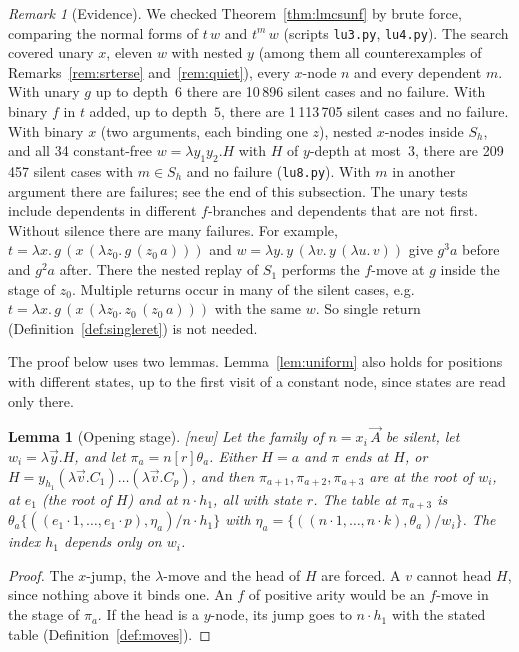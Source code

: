 \documentclass[11pt]{article}
\newcommand{\suc}[2]{#1{\cdot}#2}
\newcommand{\New}{\textsf{[new]}}
\theoremstyle{plain}
\newtheorem{lemma}[theorem]{Lemma}
\theoremstyle{definition}
\theoremstyle{remark}
\newtheorem{remark}[theorem]{Remark}
\begin{document}
\begin{remark}[Evidence]\label{rem:lmcsunfev}
We checked Theorem~\ref{thm:lmcsunf} by brute force, comparing the normal
forms of $t\,w$ and $t^m\,w$ (scripts \texttt{lu3.py},
\texttt{lu4.py}).  The search covered unary $x$, eleven $w$ with nested
$y$ (among them all counterexamples of Remarks~\ref{rem:srterse}
and~\ref{rem:quiet}), every $x$-node $n$ and every dependent $m$.  With
unary $g$ up to depth~$6$ there are 10\,896 silent cases and no failure.
With binary $f$ in $t$ added, up to depth~$5$, there are 1\,113\,705
silent cases and no failure.  With binary $x$ (two arguments, each
binding one $z$), nested $x$-nodes inside $S_h$, and all 34 constant-free
$w=\lambda y_1y_2.H$ with $H$ of $y$-depth at most~$3$, there are
209\,457 silent cases with $m\in S_h$ and no failure (\texttt{lu8.py}).
With $m$ in another argument there are failures; see the end of this
subsection.  The unary tests include dependents in different
$f$-branches and dependents that are not first.  Without silence there
are many failures.  For example, $t=\lambda x.\,g\,(x\,(\lambda z_0.\,g\,(z_0\,a)))$
and $w=\lambda y.\,y\,(\lambda v.\,y\,(\lambda u.\,v))$ give $g^3a$
before and $g^2a$ after.  There the nested replay of $S_1$ performs the
$f$-move at $g$ inside the stage of $z_0$.  Multiple returns occur in
many of the silent cases, e.g.\ $t=\lambda
x.\,g\,(x\,(\lambda z_0.\,z_0\,(z_0\,a)))$ with the same $w$.  So
single return (Definition~\ref{def:singleret}) is not needed.
\end{remark}

The proof below uses two lemmas.  Lemma~\ref{lem:uniform} also
holds for positions with different states, up to the first visit of a
constant node, since states are read only there.

\begin{lemma}[Opening stage]\label{lem:opening}
\New{} Let the family of $n=x_i\,\vec A$ be silent, let $w_i=\lambda\vec
y.H$, and let $\pi_a=n[r]\theta_a$.  Either $H=a$ and $\pi$ ends at
$H$, or $H=y_{h_1}(\lambda\vec v.C_1)\dots(\lambda\vec v.C_p)$, and then
$\pi_{a+1},\pi_{a+2},\pi_{a+3}$ are at the root of $w_i$, at $e_1$ (the
root of $H$) and at $\suc n{h_1}$, all with state $r$.  The table at
$\pi_{a+3}$ is $\theta_a\{((\suc{e_1}1,\dots,\suc{e_1}p),\eta_a)/\suc
n{h_1}\}$ with $\eta_a=\{((\suc n1,\dots,\suc nk),\theta_a)/w_i\}$.  The
index $h_1$ depends only on $w_i$.
\end{lemma}
\begin{proof}
The $x$-jump, the $\lambda$-move and the head of $H$ are forced.  A
$v$ cannot head $H$, since nothing above it binds one.  An $f$ of
positive arity would be an $f$-move in the stage of $\pi_a$.  If the head
is a $y$-node, its jump goes to $\suc n{h_1}$ with the stated table
(Definition~\ref{def:moves}).
\end{proof}
\end{document}
